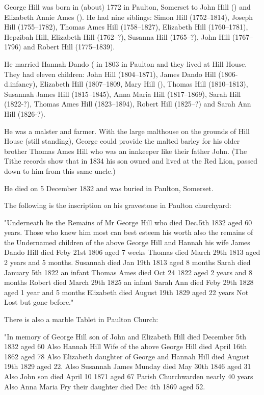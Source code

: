 
George Hill was born in (about) 1772 in	Paulton, Somerset to John Hill () and Elizabeth Annie Ames ().  He had nine siblings: Simon Hill (1752--1814), Joseph Hill (1755--1782), Thomas Ames Hill (1758--1827), Elizabeth Hill (1760--1781), Hepzibah Hill, Elizabeth Hill (1762--?), Susanna Hill (1765--?),
John Hill (1767--1796) and Robert Hill (1775--1839). 

He married Hannah Dando ( in 1803 in Paulton and they lived at Hill House. They had eleven children: 
John Hill (1804--1871), James Dando Hill (1806-d.infancy), Elizabeth Hill (1807--1809, Mary Hill (),
Thomas Hill (1810--1813), Susannah James Hill (1815--1845), Anna Maria Hill (1817--1869), Sarah Hill (1822-?),
Thomas Ames Hill (1823--1894), Robert Hill (1825--?) and Sarah Ann Hill (1826-?). 
    
He was a malster and farmer. With the large malthouse on the grounds of Hill House (still standing), George could provide the malted barley for his older brother Thomas Ames Hill who was an innkeeper like their father John. (The Tithe records show that in 1834 his son owned and lived at the Red Lion, passed down to him from this same uncle.) 

He died on 5 December 1832 and was buried in Paulton, Somerset.

The following is the inscription on his gravestone in Paulton churchyard:

"Underneath lie the Remains of Mr George Hill who died Dec.5th 1832 aged 60 years.
Those who knew him most can best esteem his worth also the remains of the Undernamed children of the above
George Hill and Hannah his wife
James Dando Hill died Feby 21st 1806 aged 7 weeks
Thomas died March 29th 1813 aged 2 years and 5 months.
Susannah died Jan 19th 1813 aged 8 months
Sarah died January 5th 1822 an infant
Thomas Ames died Oct 24 1822 aged 2 years and 8 months
Robert died March 29th 1825 an infant
Sarah Ann died Feby 29th 1828 aged 1 year and 5 months
Elizabeth died August 19th 1829 aged 22 years
Not Lost but gone before."

There is also a marble Tablet in Paulton Church:

"In memory of George Hill son of John and Elizabeth Hill died December 5th 1832 aged 60
Also Hannah Hill Wife of the above George Hill died April 16th 1862 aged 78
Also Elizabeth daughter of George and Hannah Hill died August 19th 1829 aged 22.
Also Susannah James Munday died May 30th 1846 aged 31
Also John son died April 10 1871 aged 67 Parish Churchwarden nearly 40 years
Also Anna Maria Fry their daughter died Dec 4th 1869 aged 52.


